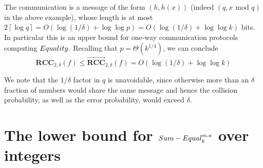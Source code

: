 \documentclass[11pt]{article}
\numberwithin{equation}{section}
\theoremstyle{definition}
\theoremstyle{plain}
\newcommand{\ceil}[1]{ {\left\lceil{#1} \right\rceil}}
\newcommand{\error}{\ensuremath{\delta}}
\renewcommand{\mod}{\text{ mod }}
\newcommand{\bigo}[1]{\ensuremath{{{O} \left( {#1} \right)}}}
\newcommand{\bigtheta}[1]{\ensuremath{{\Theta\left({#1} \right)}}}
\newcommand{\rcc}{\ensuremath{\mathbf{RCC}}}
\newcommand{\rccone}{\ensuremath{\overrightarrow{\mathbf{RCC}}}}
\newcommand{\sumequal}{\textsc{Sum-Equal} }
\begin{document}
The communication is a message of the form $(h,h(x))$ (indeed $(q, x\mod q)$ in the above example), whose length is at most $2\ceil{\log q}=\bigo{\log(1/\error)+\log\log p}=\bigo{\log(1/\error)+\log\log k}$ bits.
In particular this is an upper bound for one-way communication protocols computing $\textsc{Equality}$.
%
Recalling that $p=\bigtheta{k^{1/4}}$,
we can conclude
\[
\rcc_{2,\error} (f) \le\rccone_{2,\error}(f)=\bigo{\log(1/\error)+\log\log k}
\]

We note that the $1/\error$ factor in $q$ is unavoidable, since otherwise more than an $\error$ fraction of numbers would share the same message and hence the collision probability, as well as the error probability, would exceed $\error$.

%
%
\section{The lower bound for
  \texorpdfstring{$\sumequal^{m,a}_k$}{Sum-Equal-sup(m,a)sub(k)} over integers}

\label{sec:over Z}
\end{document}
